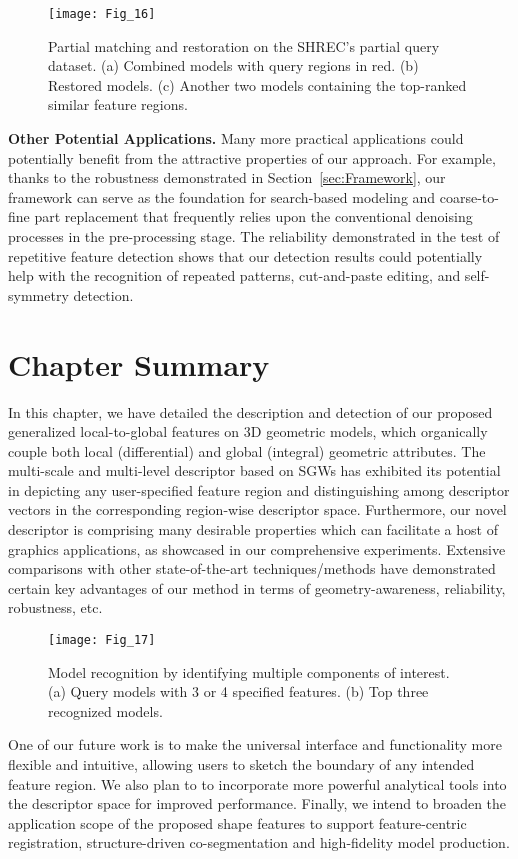 \begin{figure}[!to]
\texttt{[image: Fig\_16]}
\caption[Partial shape matching and restoration.]
 {Partial matching and restoration on the SHREC's partial query
  dataset. (a) Combined models with query regions in red. (b) Restored
  models.  (c) Another two models containing the top-ranked similar
  feature regions.}
\label{partial-query}
\end{figure}

\textbf{Other Potential Applications.} Many more practical applications
could potentially benefit from the attractive properties of our
approach. For example, thanks to the robustness demonstrated in
Section~\ref{sec:Framework}, our framework can serve as the foundation
for search-based modeling and coarse-to-fine part replacement that
frequently relies upon the conventional denoising processes in the
pre-processing stage. The reliability demonstrated in the test of
repetitive feature detection shows that our detection results could
potentially help with the recognition of repeated patterns,
cut-and-paste editing, and self-symmetry detection.

\section{Chapter Summary}
\label{sec:feature:sum}

In this chapter, we have detailed the description and detection of our
proposed generalized local-to-global features on 3D geometric models,
which organically couple both local (differential) and global
(integral) geometric attributes. The multi-scale and multi-level
descriptor based on SGWs has exhibited its potential in depicting any
user-specified feature region and distinguishing among descriptor
vectors in the corresponding region-wise descriptor space.
Furthermore, our novel descriptor is comprising many desirable
properties which can facilitate a host of graphics applications, as
showcased in our comprehensive experiments. Extensive comparisons with
other state-of-the-art techniques/methods have demonstrated certain
key advantages of our method in terms of geometry-awareness,
reliability, robustness, etc.

\begin{figure}[!to]
\begin{center}
\texttt{[image: Fig\_17]}
\end{center}
\caption[Model recognition by identifying multiple components.]
 {Model recognition by identifying multiple components of
 interest. (a) Query models with 3 or 4 specified features.
  (b) Top three recognized models.}
\label{recognition}
\end{figure}

One of our future work is to make the universal interface and functionality 
more flexible and intuitive, allowing users to sketch the boundary of any
intended feature region. We also plan to to incorporate more powerful
analytical tools into the descriptor space for improved performance. 
Finally, we intend to broaden the application scope of the proposed shape features to support feature-centric registration, structure-driven co-segmentation 
and high-fidelity model production. 